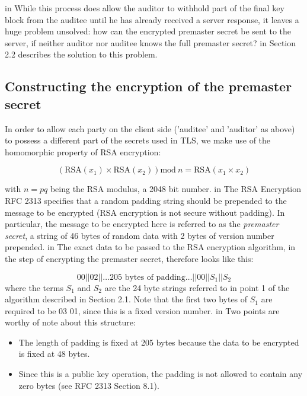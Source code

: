 \documentclass[10pt,a4paper]{article}
\begin{document}
 in 
\noindent While this process does allow the auditor to withhold part of the final key block from the auditee until he has already received a server response, it leaves a huge problem unsolved: how can the encrypted premaster secret be sent to the server, if neither auditor nor auditee knows the full premaster secret?
 in 
\noindent Section 2.2 describes the solution to this problem.


\subsection{Constructing the encryption of the premaster secret}
\noindent In order to allow each party on the client side ('auditee' and 'auditor' as above) to possess a different part of the secrets used in TLS, we make use of the homomorphic property of RSA encryption:
\begin{center}
\[\left(\textrm{RSA}(x_1) \times \textrm{RSA}(x_2)\right) \textrm{mod}\ n = \textrm{RSA}(x_1 \times x_2)\]
\end{center}
\noindent with $n=pq$ being the RSA modulus, a 2048 bit number.
 in 
\noindent The RSA Encryption RFC 2313 \cite{RSA_spec} specifies that a random padding string should be prepended to the message to be encrypted (RSA encryption is not secure without padding). In particular, the message to be encrypted here is referred to as the \textit{premaster secret}, a string of 46 bytes of random data with 2 bytes of version number prepended.
 in 
\noindent The exact data to be passed to the RSA encryption algorithm, in the step of encrypting the premaster secret, therefore looks like this:

\begin{equation}\label{blockformat}
 00 || 02 || \ldots \textrm{205 bytes of padding} \ldots || 00 || S_1 || S_2  
\end{equation}
where the terms $S_1$ and $S_2$ are the 24 byte strings referred to in point 1 of the algorithm described in Section 2.1. Note that the first two bytes of $S_1$ are required to be 03 01, since this is a fixed version number.
 in 
\noindent Two points are worthy of note about this structure:
\begin{itemize}
\item The length of padding is fixed at 205 bytes because the data to be encrypted is fixed at 48 bytes.
\item Since this is a public key operation, the padding is not allowed to contain any zero bytes (see RFC 2313 Section 8.1).
\end{itemize}
\end{document}
